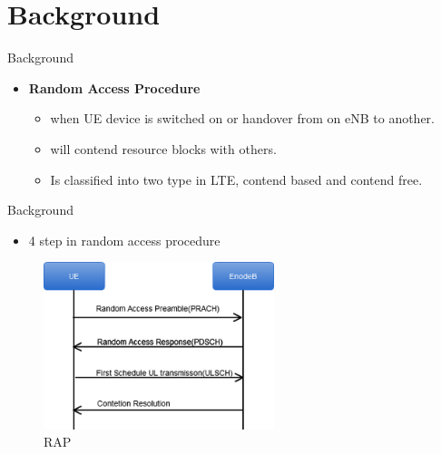 \documentclass{beamer}
\begin{document}
\section{Background}
\begin{frame}{Background}
\begin{itemize}
    \item \textbf{Random Access Procedure}
    \begin{itemize}
        \item {when UE device is switched on or handover from on eNB to another.}
        \item{will contend resource blocks with others.}
        \item{Is classified into two type in LTE, contend based and contend free.}
    \end{itemize}
\end{itemize}

\end{frame}
\begin{frame}{Background}
    \begin{itemize}
    \item{4 step in random access procedure}
    \end{itemize}
    \begin{figure}[t]
        \centering
        \includegraphics[width=0.6\textwidth]{figures/rach.png}
        \caption{RAP}
    \end{figure}
\end{frame}

\end{document}
